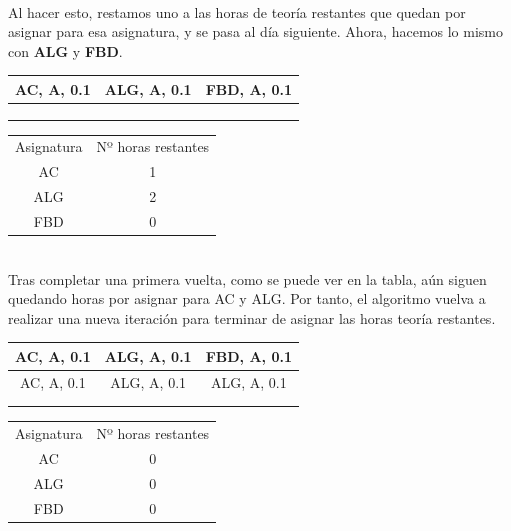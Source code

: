 ~\\
Al hacer esto, restamos uno a las horas de teoría restantes que quedan por asignar para esa asignatura, y se pasa al día siguiente. Ahora, hacemos lo mismo con \textbf{ALG} y \textbf{FBD}.\\

\begin{minipage}{0.5\textwidth}    
\begin{tabular}{| c | c | c |}
\hline
AC, A, 0.1 & ALG, A, 0.1  & FBD, A, 0.1 \\
 \hline
 &  &  \\
 \hline
 &  &  \\
 \hline
 &  &  \\
 \hline 
\end{tabular}
\end{minipage}
\begin{minipage}{0.5\textwidth}
\begin{tabular}{c | c}
Asignatura & Nº horas restantes \\
AC & 1 \\
ALG & 2 \\
FBD & 0
\end{tabular}
\end{minipage}
~\\
Tras completar una primera vuelta, como se puede ver en la tabla, aún siguen quedando horas por asignar para AC y ALG. Por tanto, el algoritmo vuelva a realizar una nueva iteración para terminar de asignar las horas teoría restantes.\\

\begin{minipage}{0.5\textwidth}    
\begin{tabular}{| c | c | c |}
\hline
AC, A, 0.1 & ALG, A, 0.1  & FBD, A, 0.1 \\
 \hline
AC, A, 0.1 & ALG, A, 0.1 & ALG, A, 0.1  \\
 \hline
 &  &  \\
 \hline
 &  &  \\
 \hline 
\end{tabular}
\end{minipage}
\begin{minipage}{0.5\textwidth}
\begin{tabular}{c | c}
Asignatura & Nº horas restantes \\
AC & 0 \\
ALG & 0 \\
FBD & 0
\end{tabular}
\end{minipage}

